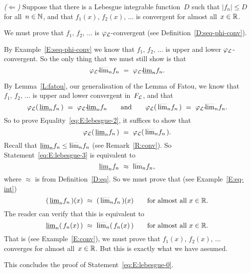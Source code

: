 \documentclass[main.tex]{subfiles}
\begin{document}
\begin{ex}
\vspace{.3em}
\emph{($\Longleftarrow$)}
Suppose that there is a Lebesgue integrable function~$D$
such that $|f_n|\leq D$ for all~$n\in\mathbb{N}$,
and that  $f_1(x),\,f_2(x),\,\dotsc$
is convergent for almost all~$x\in\mathbb{R}$.

We must prove that $f_1,\,f_2,\,\dotsc$
is $\varphi_{\mathcal{L}}$-convergent (see Definition~\ref{D:seq-phi-conv}).

By Example~\ref{E:seq-phi-conv}
we know that $f_1,\,f_2,\,\dotsc$ is upper and lower
$\varphi_{\mathcal{L}}$-convergent.
So the only thing that we must still show is
that 
\begin{equation}
\label{eq:E:lebesgue-2}
{\varphi_{\mathcal{L}}}\text{-}\!\smash{\overline{\lim}_{n}} f_n \ =\  {\varphi_{\mathcal{L}}}\text{-}\!\smash{\underline{\lim}_{n}} f_n.
\end{equation}

By Lemma~\ref{L:fatou}, our generalisation of the Lemma of Fatou,
we know that $f_1,\,f_2,\,\dotsc$
is upper and lower convergent in~$F_{\mathcal{L}}$,
and that 
\begin{equation*}
\Lphi(\,\llim{n} f_n\,) \ =\ 
\pllim\Lphi{n} f_n
\qquad\text{and}\qquad
\Lphi(\,\ulim{n} f_n\,) \ =\ 
\pulim\Lphi{n} f_n.
\end{equation*}
So to prove Equality~\eqref{eq:E:lebesgue-2},
it suffices to show that 
\begin{equation}
\label{eq:E:lebesgue-3}
\varphi_{\mathcal{L}}(\,\smash{\underline{\lim}_{n}} f_n\,) \ =\  \varphi_{\mathcal{L}}(\,\smash{\overline{\lim}_{n}} f_n\,).
\end{equation}
Recall that $\smash{\underline{\lim}_{n}}f_n \leq \smash{\overline{\lim}_{n}}f_n$
(see Remark~\ref{R:conv}).
So Statement~\ref{eq:E:lebesgue-3}
is equivalent to 
\begin{equation*}
\smash{\underline{\lim}_{n}} f_n \ \approx\  \smash{\overline{\lim}_{n}} f_n,
\end{equation*}
where $\approx$ is from Definition~\ref{D:eq}.
So we must prove that (see Example~\ref{E:eq-int})
\begin{equation*}
(\,\smash{\underline{\lim}_{n}} f_n\,) (x)\ \approx\  (\,\smash{\overline{\lim}_{n}} f_n\,)(x)
\qquad\text{for almost all $x\in\mathbb{R}$}.
\end{equation*}
The reader can verify that this is equivalent to
\begin{equation*}
\smash{\underline{\lim}_{n}} (\, f_n (x)\,)\ \approx\  \smash{\overline{\lim}_{n}} (\,f_n(x)\,)
\qquad\text{for almost all $x\in\mathbb{R}$}.
\end{equation*}
That is (see Example~\ref{E:conv}),
we must prove that $f_1(x),\,f_2(x),\,\dotsc$
converges for almost all~$x\in\mathbb{R}$.
But this is exactly what we have assumed.

This concludes the proof of Statement~\eqref{eq:E:lebesgue-0}.
\end{ex}
\end{document}
